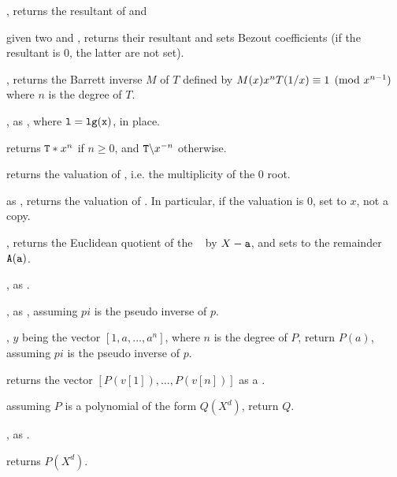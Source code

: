 , returns the resultant
of  and 

given two   and ,
returns their resultant and sets Bezout coefficients (if the resultant is 0,
the latter are not set).

, returns the Barrett inverse
$M$ of $T$ defined by $M(x)\*x^n\*T(1/x)\equiv 1\pmod{x^{n-1}}$ where $n$ is
the degree of $T$.

, as , where
${\tt l} = {\tt lg(x)}$, in place.

 returns ${\tt T} * x^n$ if $n\geq 0$,
and $\kbd{T} \bs x^{-n}$ otherwise.

 returns the valuation of , i.e. the
multiplicity of the $0$ root.

 as , returns the
valuation of . In particular, if the valuation is $0$, set 
to $x$, not a copy.

, returns the
Euclidean quotient of the ~ by $X - {\tt a}$, and sets
 to the remainder $ {\tt A}({\tt a})$.

, as .

, as ,
assuming $pi$ is the pseudo inverse of $p$.

, $y$ being
the vector $[1,a,\dots,a^n]$, where $n$ is the degree of $P$, return $P(a)$,
assuming $pi$ is the pseudo inverse of $p$.

 returns the vector
$[P(v[1]),\ldots,P(v[n])]$ as a .

 assuming $P$ is a polynomial of the
form $Q(X^d)$, return $Q$.

, as .

 returns $P(X^d)$.


